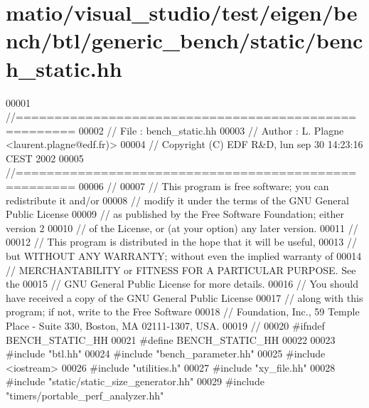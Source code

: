 \hypertarget{matio_2visual__studio_2test_2eigen_2bench_2btl_2generic__bench_2static_2bench__static_8hh_source}{}\section{matio/visual\+\_\+studio/test/eigen/bench/btl/generic\+\_\+bench/static/bench\+\_\+static.hh}
\label{matio_2visual__studio_2test_2eigen_2bench_2btl_2generic__bench_2static_2bench__static_8hh_source}

\begin{DoxyCode}
00001 \textcolor{comment}{//=====================================================}
00002 \textcolor{comment}{// File   :  bench\_static.hh}
00003 \textcolor{comment}{// Author :  L. Plagne <laurent.plagne@edf.fr)>}
00004 \textcolor{comment}{// Copyright (C) EDF R&D,  lun sep 30 14:23:16 CEST 2002}
00005 \textcolor{comment}{//=====================================================}
00006 \textcolor{comment}{//}
00007 \textcolor{comment}{// This program is free software; you can redistribute it and/or}
00008 \textcolor{comment}{// modify it under the terms of the GNU General Public License}
00009 \textcolor{comment}{// as published by the Free Software Foundation; either version 2}
00010 \textcolor{comment}{// of the License, or (at your option) any later version.}
00011 \textcolor{comment}{//}
00012 \textcolor{comment}{// This program is distributed in the hope that it will be useful,}
00013 \textcolor{comment}{// but WITHOUT ANY WARRANTY; without even the implied warranty of}
00014 \textcolor{comment}{// MERCHANTABILITY or FITNESS FOR A PARTICULAR PURPOSE.  See the}
00015 \textcolor{comment}{// GNU General Public License for more details.}
00016 \textcolor{comment}{// You should have received a copy of the GNU General Public License}
00017 \textcolor{comment}{// along with this program; if not, write to the Free Software}
00018 \textcolor{comment}{// Foundation, Inc., 59 Temple Place - Suite 330, Boston, MA  02111-1307, USA.}
00019 \textcolor{comment}{//}
00020 \textcolor{preprocessor}{#ifndef BENCH\_STATIC\_HH}
00021 \textcolor{preprocessor}{#define BENCH\_STATIC\_HH}
00022 
00023 \textcolor{preprocessor}{#include "btl.hh"}
00024 \textcolor{preprocessor}{#include "bench\_parameter.hh"}
00025 \textcolor{preprocessor}{#include <iostream>}
00026 \textcolor{preprocessor}{#include "utilities.h"}
00027 \textcolor{preprocessor}{#include "xy\_file.hh"}
00028 \textcolor{preprocessor}{#include "static/static\_size\_generator.hh"}
00029 \textcolor{preprocessor}{#include "timers/portable\_perf\_analyzer.hh"}

\end{DoxyCode}
